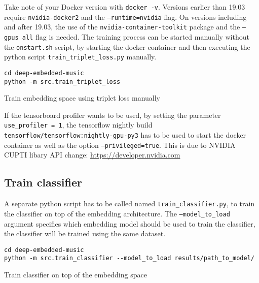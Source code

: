 \noindent
Take note of your Docker version with \texttt{docker -v}. Versions earlier than
19.03 require \texttt{nvidia-docker2} and the \texttt{--runtime=nvidia} flag. On versions
including and after 19.03, the use of the \texttt{nvidia-container-toolkit}
package and the \texttt{--gpus all} flag is needed.
\newline
\newline
The training process can be started manually without the \texttt{onstart.sh} script, by starting the docker container and then executing the python script \texttt{train\_triplet\_loss.py} manually.
\begin{code}[H]
\begin{verbatim}
cd deep-embedded-music
python -m src.train_triplet_loss
\end{verbatim}
\caption{Train embedding space using triplet loss manually}
\label{code:Train-triplet-loss-manually}
\end{code}
\noindent
If the tensorboard profiler wants to be used, by setting the parameter
\texttt{use\_profiler\ =\ 1}, the tensorflow nightly build
\texttt{tensorflow/tensorflow:nightly-gpu-py3} has to be used to start
the docker container as well as the option \texttt{--privileged=true}.
This is due to NVIDIA CUPTI libary API change:
\newline
\href{https://developer.nvidia.com/nvidia-development-tools-solutions-err-nvgpuctrperm-cupti}{https://developer.nvidia.com}

\subsection{Train classifier}
A separate python script has to be called named
\texttt{train\_classifier.py}, to train the classifier on top of the
embedding architecture. The \texttt{--model\_to\_load} argument
specifies which embedding model should be used to train the classifier,
the classifier will be trained using the same dataset.
\begin{code}[H]
\begin{verbatim}
cd deep-embedded-music
python -m src.train_classifier --model_to_load results/path_to_model/
\end{verbatim}
\caption{Train classifier on top of the embedding space}
\label{code:Train-classifier}
\end{code}

